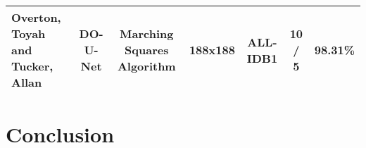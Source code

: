 \begin{table}[]
\begin{adjustbox}{angle=0}
\begin{tabular}{|l|cc|c|c|c|cc|}
\rowcolor[HTML]{C0C0C0} 
\textbf{Overton, Toyah and Tucker, Allan}                        & \multicolumn{1}{c|}{\cellcolor[HTML]{C0C0C0}DO-U-Net}                                                                                    & Marching Squares Algorithm                                                                                 & 188x188                                                            & ALL-IDB1               & 10 / 5                         & \multicolumn{2}{c|}{\cellcolor[HTML]{C0C0C0}98.31\%}                                                                                                                  \\ \hline
\end{tabular}
\end{adjustbox}
\end{table}

\section{Conclusion}
\vspace{0.1in}
\hspace*{0.16in}
